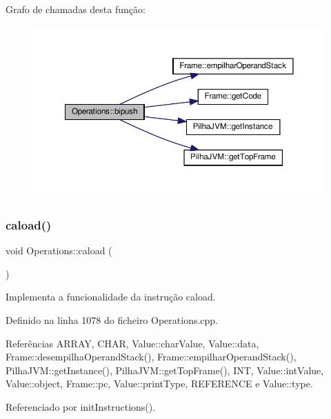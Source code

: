 Grafo de chamadas desta função\+:\nopagebreak
\begin{figure}[H]
\begin{center}
\leavevmode
\includegraphics[width=350pt]{classOperations_a981b0f43cbe76b4fe7e2122c482d4a5b_cgraph}
\end{center}
\end{figure}
\mbox{\label{classOperations_a4bb55ffc2ba79a76a019a0c02d29d7f9}} 
\subsubsection{\texorpdfstring{caload()}{caload()}}
{\footnotesize\ttfamily void Operations\+::caload (\begin{DoxyParamCaption}{ }\end{DoxyParamCaption})\hspace{0.3cm}{\ttfamily [private]}}



Implementa a funcionalidade da instrução caload. 



Definido na linha 1078 do ficheiro Operations.\+cpp.



Referências A\+R\+R\+AY, C\+H\+AR, Value\+::char\+Value, Value\+::data, Frame\+::desempilha\+Operand\+Stack(), Frame\+::empilhar\+Operand\+Stack(), Pilha\+J\+V\+M\+::get\+Instance(), Pilha\+J\+V\+M\+::get\+Top\+Frame(), I\+NT, Value\+::int\+Value, Value\+::object, Frame\+::pc, Value\+::print\+Type, R\+E\+F\+E\+R\+E\+N\+CE e Value\+::type.



Referenciado por init\+Instructions().

